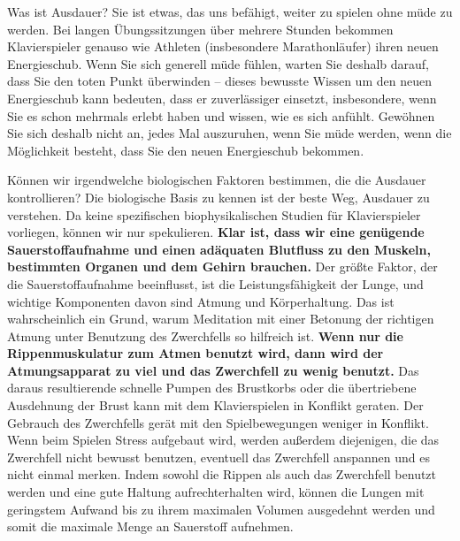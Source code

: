 Was ist Ausdauer? Sie ist etwas, das uns befähigt, weiter zu spielen ohne müde zu werden.
Bei langen Übungssitzungen über mehrere Stunden bekommen Klavierspieler genauso wie Athleten (insbesondere Marathonläufer) ihren neuen Energieschub.
Wenn Sie sich generell müde fühlen, warten Sie deshalb darauf, dass Sie den toten Punkt überwinden -- dieses bewusste Wissen um den neuen Energieschub kann bedeuten, dass er zuverlässiger einsetzt, insbesondere, wenn Sie es schon mehrmals erlebt haben und wissen, wie es sich anfühlt.
Gewöhnen Sie sich deshalb nicht an, jedes Mal auszuruhen, wenn Sie müde werden, wenn die Möglichkeit besteht, dass Sie den neuen Energieschub bekommen.

Können wir irgendwelche biologischen Faktoren bestimmen, die die Ausdauer kontrollieren?
Die biologische Basis zu kennen ist der beste Weg, Ausdauer zu verstehen.
Da keine spezifischen biophysikalischen Studien für Klavierspieler vorliegen, können wir nur spekulieren.
\textbf{Klar ist, dass wir eine genügende Sauerstoffaufnahme und einen adäquaten Blutfluss zu den Muskeln, bestimmten Organen und dem Gehirn brauchen.}
Der größte Faktor, der die Sauerstoffaufnahme beeinflusst, ist die Leistungsfähigkeit der Lunge, und wichtige Komponenten davon sind Atmung und Körperhaltung.
Das ist wahrscheinlich ein Grund, warum Meditation mit einer Betonung der richtigen Atmung unter Benutzung des Zwerchfells so hilfreich ist.
\textbf{Wenn nur die Rippenmuskulatur zum Atmen benutzt wird, dann wird der Atmungsapparat zu viel und das Zwerchfell zu wenig benutzt.}
Das daraus resultierende schnelle Pumpen des Brustkorbs oder die übertriebene Ausdehnung der Brust kann mit dem Klavierspielen in Konflikt geraten.
Der Gebrauch des Zwerchfells gerät mit den Spielbewegungen weniger in Konflikt.
Wenn beim Spielen Stress aufgebaut wird, werden außerdem diejenigen, die das Zwerchfell nicht bewusst benutzen, eventuell das Zwerchfell anspannen und es nicht einmal merken.
Indem sowohl die Rippen als auch das Zwerchfell benutzt werden und eine gute Haltung aufrechterhalten wird, können die Lungen mit geringstem Aufwand bis zu ihrem maximalen Volumen ausgedehnt werden und somit die maximale Menge an Sauerstoff aufnehmen.

